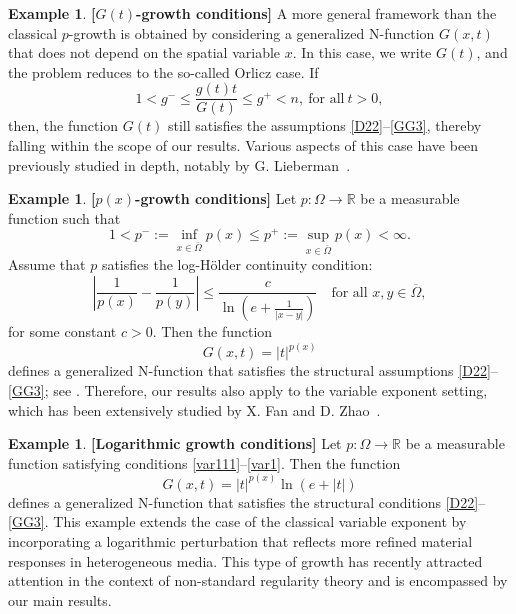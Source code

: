 \documentclass[10pt,reqno]{amsart}
\newcommand *\w{^\wedge}
\theoremstyle{definition}
\newtheorem{example}[thm]{Example}
\numberwithin{equation}{section}
\begin{document}
\begin{example}{\rm\bf{[\(G(t)\)-growth conditions]}} \label{ex2}
A more general framework than the classical \(p\)-growth is obtained by considering a generalized \textnormal{N}-function \(G(x,t)\) that does not depend on the spatial variable \(x\). In this case, we write \(G(t)\), and the problem reduces to the so-called Orlicz case. If 
\[ 
1 < g^- \leq \frac{g(t)t}{G(t)} \leq g^+ <n,\ \text{for all}\ t>0, 
\]
then, the function \(G(t)\) still satisfies the assumptions \eqref{D22}--\eqref{GG3}, thereby falling within the scope of our results. Various aspects of this case have been previously studied in depth, notably by G. Lieberman~\cite{Li1991}.
\end{example}

\begin{example}{\rm\bf{[\(p(x)\)-growth conditions]}} \label{ex3}
Let \(p:\Omega \rightarrow \mathbb{R}\) be a measurable function such that
\begin{equation}\label{var111}
1 < p^- := \inf_{x \in \overline{\Omega}} p(x) \leq p^+ := \sup_{x \in \overline{\Omega}} p(x) < \infty.
\end{equation}
Assume that \(p\) satisfies the log-Hölder continuity condition:
\begin{equation}\label{var1}
    \left|\frac{1}{p(x)} - \frac{1}{p(y)}\right| \leq \frac{c}{\ln\left(e + \frac{1}{|x - y|}\right)} \quad \text{for all } x, y \in \overline{\Omega},
\end{equation}
for some constant \(c > 0\). Then the function
\[
G(x,t) = |t|^{p(x)}
\]
defines a generalized \textnormal{N}-function that satisfies the structural assumptions \eqref{D22}--\eqref{GG3}; see \cite[Section 7.1]{Harjulehto2019}. Therefore, our results also apply to the variable exponent setting, which has been extensively studied by X. Fan and D. Zhao~\cite{Fan1999}.
\end{example}
\begin{example}{\rm\bf{[Logarithmic growth conditions]}} \label{ex4}
Let \(p: \Omega \rightarrow \mathbb{R}\) be a measurable function satisfying conditions \eqref{var111}--\eqref{var1}. Then the function
\[
G(x,t) = |t|^{p(x)} \ln(e + |t|)
\]
defines a generalized \textnormal{N}-function that satisfies the structural conditions \eqref{D22}--\eqref{GG3}. This example extends the case of the classical variable exponent by incorporating a logarithmic perturbation that reflects more refined material responses in heterogeneous media. This type of growth has recently attracted attention in the context of non-standard regularity theory and is encompassed by our main results.
\end{example}
\end{document}
